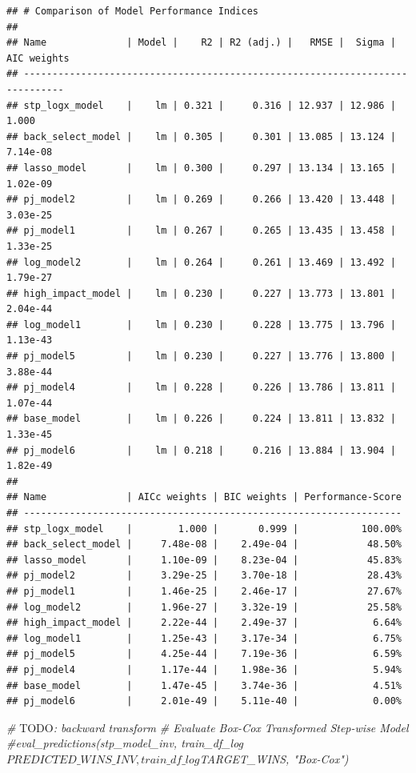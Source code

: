 \documentclass[
]{article}
\newenvironment{Shaded}{\begin{snugshade}}{\end{snugshade}}
\newcommand{\AlertTok}[1]{\textcolor[rgb]{0.94,0.16,0.16}{#1}}
\newcommand{\CommentTok}[1]{\textcolor[rgb]{0.56,0.35,0.01}{\textit{#1}}}
\begin{document}
\begin{verbatim}
## # Comparison of Model Performance Indices
## 
## Name              | Model |    R2 | R2 (adj.) |   RMSE |  Sigma | AIC weights
## -----------------------------------------------------------------------------
## stp_logx_model    |    lm | 0.321 |     0.316 | 12.937 | 12.986 |       1.000
## back_select_model |    lm | 0.305 |     0.301 | 13.085 | 13.124 |    7.14e-08
## lasso_model       |    lm | 0.300 |     0.297 | 13.134 | 13.165 |    1.02e-09
## pj_model2         |    lm | 0.269 |     0.266 | 13.420 | 13.448 |    3.03e-25
## pj_model1         |    lm | 0.267 |     0.265 | 13.435 | 13.458 |    1.33e-25
## log_model2        |    lm | 0.264 |     0.261 | 13.469 | 13.492 |    1.79e-27
## high_impact_model |    lm | 0.230 |     0.227 | 13.773 | 13.801 |    2.04e-44
## log_model1        |    lm | 0.230 |     0.228 | 13.775 | 13.796 |    1.13e-43
## pj_model5         |    lm | 0.230 |     0.227 | 13.776 | 13.800 |    3.88e-44
## pj_model4         |    lm | 0.228 |     0.226 | 13.786 | 13.811 |    1.07e-44
## base_model        |    lm | 0.226 |     0.224 | 13.811 | 13.832 |    1.33e-45
## pj_model6         |    lm | 0.218 |     0.216 | 13.884 | 13.904 |    1.82e-49
## 
## Name              | AICc weights | BIC weights | Performance-Score
## ------------------------------------------------------------------
## stp_logx_model    |        1.000 |       0.999 |           100.00%
## back_select_model |     7.48e-08 |    2.49e-04 |            48.50%
## lasso_model       |     1.10e-09 |    8.23e-04 |            45.83%
## pj_model2         |     3.29e-25 |    3.70e-18 |            28.43%
## pj_model1         |     1.46e-25 |    2.46e-17 |            27.67%
## log_model2        |     1.96e-27 |    3.32e-19 |            25.58%
## high_impact_model |     2.22e-44 |    2.49e-37 |             6.64%
## log_model1        |     1.25e-43 |    3.17e-34 |             6.75%
## pj_model5         |     4.25e-44 |    7.19e-36 |             6.59%
## pj_model4         |     1.17e-44 |    1.98e-36 |             5.94%
## base_model        |     1.47e-45 |    3.74e-36 |             4.51%
## pj_model6         |     2.01e-49 |    5.11e-40 |             0.00%
\end{verbatim}

\begin{Shaded}
\begin{Highlighting}[]
\CommentTok{\# }\AlertTok{TODO}\CommentTok{: backward transform}
\CommentTok{\# Evaluate Box{-}Cox Transformed Step{-}wise Model}
\CommentTok{\#eval\_predictions(stp\_model\_inv, train\_df\_log$PREDICTED\_WINS\_INV, train\_df\_log$TARGET\_WINS, "Box{-}Cox")}
\end{Highlighting}
\end{Shaded}
\end{document}
